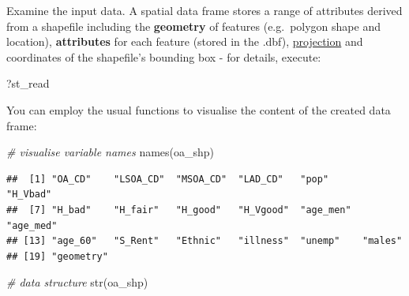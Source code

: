 \documentclass[
]{book}
\newenvironment{Shaded}{\begin{snugshade}}{\end{snugshade}}
\newcommand{\CommentTok}[1]{\textcolor[rgb]{0.56,0.35,0.01}{\textit{#1}}}
\newcommand{\FunctionTok}[1]{\textcolor[rgb]{0.00,0.00,0.00}{#1}}
\newcommand{\NormalTok}[1]{#1}
\begin{document}
Examine the input data. A spatial data frame stores a range of attributes derived from a shapefile including the \textbf{geometry} of features (e.g.~polygon shape and location), \textbf{attributes} for each feature (stored in the .dbf), \href{https://en.wikipedia.org/wiki/Map_projection}{projection} and coordinates of the shapefile's bounding box - for details, execute:

\begin{Shaded}
\begin{Highlighting}[]
\NormalTok{?st\_read}
\end{Highlighting}
\end{Shaded}

You can employ the usual functions to visualise the content of the created data frame:

\begin{Shaded}
\begin{Highlighting}[]
\CommentTok{\# visualise variable names}
\FunctionTok{names}\NormalTok{(oa\_shp)}
\end{Highlighting}
\end{Shaded}

\begin{verbatim}
##  [1] "OA_CD"    "LSOA_CD"  "MSOA_CD"  "LAD_CD"   "pop"      "H_Vbad"  
##  [7] "H_bad"    "H_fair"   "H_good"   "H_Vgood"  "age_men"  "age_med" 
## [13] "age_60"   "S_Rent"   "Ethnic"   "illness"  "unemp"    "males"   
## [19] "geometry"
\end{verbatim}

\begin{Shaded}
\begin{Highlighting}[]
\CommentTok{\# data structure}
\FunctionTok{str}\NormalTok{(oa\_shp)}
\end{Highlighting}
\end{Shaded}
\end{document}

